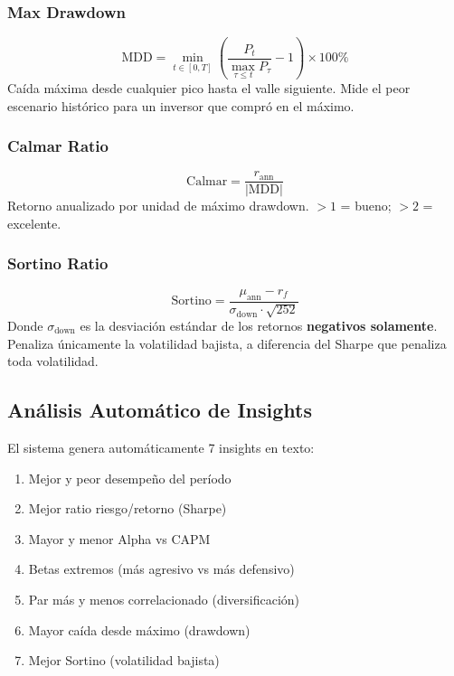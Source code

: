 \documentclass[11pt, a4paper]{article}
\begin{document}
\subsubsection{Max Drawdown}

\begin{formulabox}
  \[ \text{MDD} = \min_{t \in [0,T]} \left(\frac{P_t}{\max_{\tau \leq t} P_\tau} - 1\right) \times 100\% \]
  Caída máxima desde cualquier pico hasta el valle siguiente. Mide el peor escenario histórico para un inversor que compró en el máximo.
\end{formulabox}

\subsubsection{Calmar Ratio}

\begin{formulabox}
  \[ \text{Calmar} = \frac{r_{\text{ann}}}{|\text{MDD}|} \]
  Retorno anualizado por unidad de máximo drawdown. $> 1$ = bueno; $> 2$ = excelente.
\end{formulabox}

\subsubsection{Sortino Ratio}

\begin{formulabox}
  \[ \text{Sortino} = \frac{\mu_{\text{ann}} - r_f}{\sigma_{\text{down}} \cdot \sqrt{252}} \]
  Donde $\sigma_{\text{down}}$ es la desviación estándar de los retornos \textbf{negativos solamente}. Penaliza únicamente la volatilidad bajista, a diferencia del Sharpe que penaliza toda volatilidad.
\end{formulabox}

\subsection{Análisis Automático de Insights}

El sistema genera automáticamente 7 insights en texto:
\begin{enumerate}
  \item Mejor y peor desempeño del período
  \item Mejor ratio riesgo/retorno (Sharpe)
  \item Mayor y menor Alpha vs CAPM
  \item Betas extremos (más agresivo vs más defensivo)
  \item Par más y menos correlacionado (diversificación)
  \item Mayor caída desde máximo (drawdown)
  \item Mejor Sortino (volatilidad bajista)
\end{enumerate}
\end{document}
